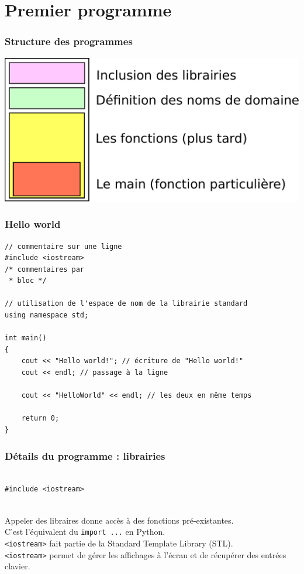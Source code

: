 \section{Premier programme}

\begin{frame}
  \frametitle{Structure des programmes}
  \centering
  \includegraphics[width=\linewidth]{images/structure.pdf}
\end{frame}

\begin{frame}[fragile]
  \frametitle{Hello world}

  \begin{verbatim}
// commentaire sur une ligne
#include <iostream>
/* commentaires par
 * bloc */

// utilisation de l'espace de nom de la librairie standard
using namespace std;

int main()
{
    cout << "Hello world!"; // écriture de "Hello world!"
    cout << endl; // passage à la ligne

    cout << "HelloWorld" << endl; // les deux en même temps

    return 0;
}
	\end{verbatim}
\end{frame}

\begin{frame}[fragile]
    \frametitle{Détails du programme : librairies}
    \begin{verbatim}
        
#include <iostream>
        
    \end{verbatim}

    Appeler des libraires donne accès à des fonctions pré-existantes. \\
    C'est l'équivalent du \texttt{import ...} en Python.\\

    \texttt{<iostream>} fait partie de la Standard Template Library (STL).\\
    \texttt{<iostream>} permet de gérer les affichages à l'écran et de récupérer des entrées clavier.
\end{frame}


